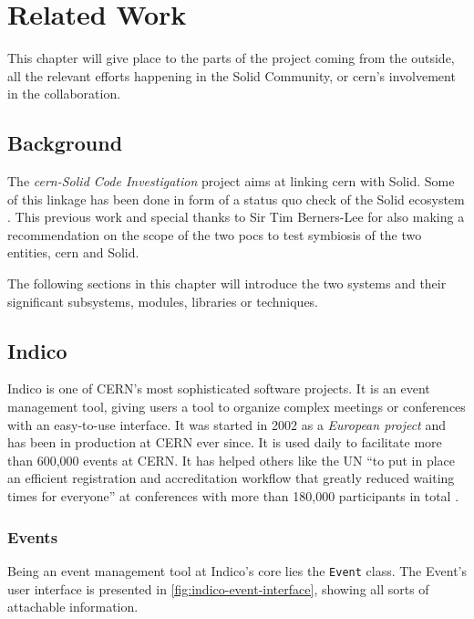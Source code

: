 \chapter{Related Work}
\setcounter{section}{0}

This chapter will give place to the parts of the project coming from the outside, all the relevant efforts happening in the Solid Community, or \gls{cern}'s involvement in the collaboration.

\section{Background}

The \textit{\gls{cern}-Solid Code Investigation} project aims at linking \gls{cern} with Solid. Some of this linkage has been done in form of a status quo check of the Solid ecosystem \cite{cern-solid-investigation-spec}. This previous work and special thanks to Sir Tim Berners-Lee for also making a recommendation on the scope of the two \glspl{poc} to test symbiosis of the two entities, \gls{cern} and Solid.

The following sections in this chapter will introduce the two systems and their significant subsystems, modules, libraries or techniques. 

\section{Indico}

Indico is one of CERN’s most sophisticated software projects. It is an event management tool, giving users a tool to organize complex meetings or conferences with an easy-to-use interface. It was started in 2002 as a \textit{European project} and has been in production at CERN ever since. It is used daily to facilitate more than 600,000 events at CERN. It has helped others like the UN “to put in place an efficient registration and accreditation workflow that greatly reduced waiting times for everyone” at conferences with more than 180,000 participants in total \cite{cern-solid-investigation-spec}.

\subsection{Events}

Being an event management tool at Indico's core lies the \texttt{Event} class. The Event's user interface is presented in \ref{fig:indico-event-interface}, showing all sorts of attachable information. 

